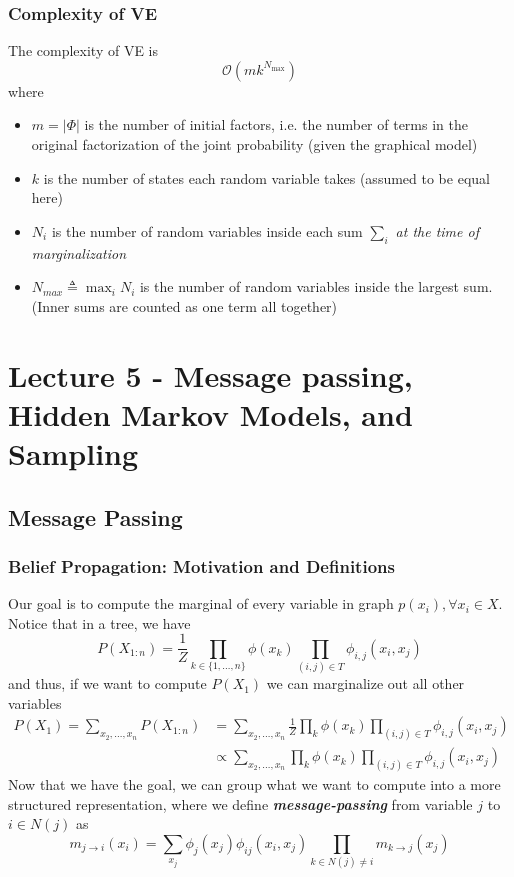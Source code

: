 \documentclass[11pt]{article}
\begin{document}
\subsubsection{Complexity of VE}
The complexity of VE is 
\begin{equation}
    \mathcal{O}\left(m k^{N_{\max }}\right)
\end{equation}
where
\begin{itemize}
    \item $m = |\Phi|$ is the number of initial factors, i.e. the number of terms in the original factorization of the joint probability (given the graphical model)
    \item $k$ is the number of states each random variable takes (assumed to be equal here)
    \item $N_i$ is the number of random variables inside each sum $\sum_i$ \textit{at the time of marginalization}
    \item $N_{max} \triangleq \max_i N_i$ is the number of random variables inside the largest sum. (Inner sums are counted as one term all together)
\end{itemize}


\section{Lecture 5 - Message passing, Hidden Markov Models, and Sampling}
\subsection{Message Passing}
\subsubsection{Belief Propagation: Motivation and Definitions}
Our goal is to compute the marginal of every variable in graph $p(x_i), \forall x_i \in X$. Notice that in a tree, we have
\begin{equation}
    P\left(X_{1: n}\right)=\frac{1}{Z} \prod_{k \in\{1,\dots,n\}} \phi\left(x_{k}\right) \prod_{(i, j) \in T} \phi_{i, j}\left(x_{i}, x_{j}\right)
\end{equation}
and thus, if we want to compute $P(X_1)$ we can marginalize out all other variables
\begin{align}
    P(X_1) = \sum_{x_2,\dots,x_n} P(X_{1:n}) 
    &= \sum_{x_2,\dots,x_n} \frac{1}{Z} \prod_k \phi\left(x_{k}\right) \prod_{(i, j) \in T} \phi_{i, j}\left(x_{i}, x_{j}\right) \\
    &\propto \sum_{x_2,\dots,x_n}  \prod_k \phi\left(x_{k}\right) \prod_{(i, j) \in T} \phi_{i, j}\left(x_{i}, x_{j}\right)
\end{align}
Now that we have the goal, we can group what we want to compute into a more structured representation, where we define \textit{\textbf{message-passing}} from variable $j$ to $i \in N(j)$ as
\begin{equation}
    m_{j \rightarrow i}\left(x_{i}\right)=\sum_{x_{j}} \phi_{j}\left(x_{j}\right) \phi_{i j}\left(x_{i}, x_{j}\right) \prod_{k \in N(j) \neq i} m_{k \rightarrow j}\left(x_{j}\right)
\end{equation}
\end{document}
